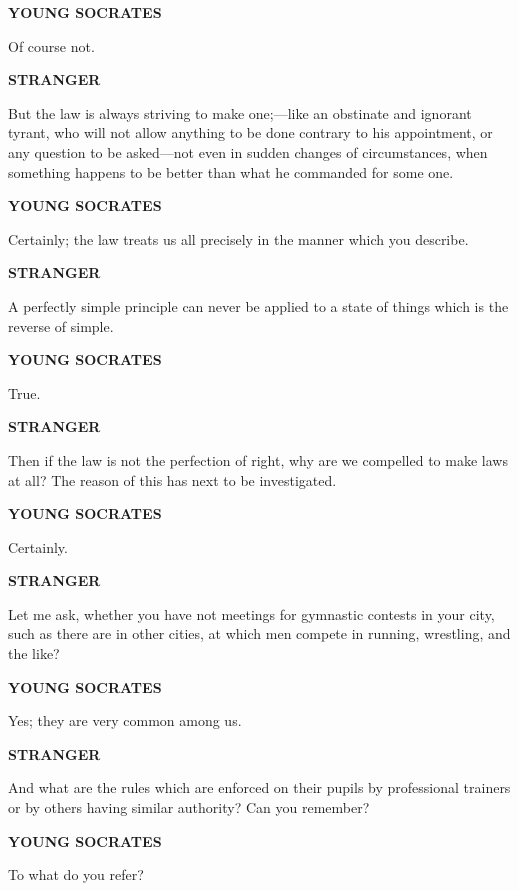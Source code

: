 \documentclass[11pt,letter]{article}
\begin{document}
\par \textbf{YOUNG SOCRATES}
\par   Of course not.

\par \textbf{STRANGER}
\par   But the law is always striving to make one;—like an obstinate and ignorant tyrant, who will not allow anything to be done contrary to his appointment, or any question to be asked—not even in sudden changes of circumstances, when something happens to be better than what he commanded for some one.

\par \textbf{YOUNG SOCRATES}
\par   Certainly; the law treats us all precisely in the manner which you describe.

\par \textbf{STRANGER}
\par   A perfectly simple principle can never be applied to a state of things which is the reverse of simple.

\par \textbf{YOUNG SOCRATES}
\par   True.

\par \textbf{STRANGER}
\par   Then if the law is not the perfection of right, why are we compelled to make laws at all? The reason of this has next to be investigated.

\par \textbf{YOUNG SOCRATES}
\par   Certainly.

\par \textbf{STRANGER}
\par   Let me ask, whether you have not meetings for gymnastic contests in your city, such as there are in other cities, at which men compete in running, wrestling, and the like?

\par \textbf{YOUNG SOCRATES}
\par   Yes; they are very common among us.

\par \textbf{STRANGER}
\par   And what are the rules which are enforced on their pupils by professional trainers or by others having similar authority? Can you remember?

\par \textbf{YOUNG SOCRATES}
\par   To what do you refer?
\end{document}
